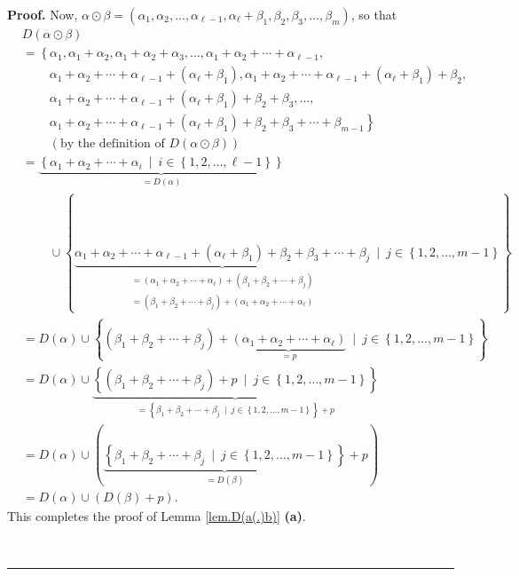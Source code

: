 \documentclass[numbers=enddot,12pt,final,onecolumn,notitlepage,abstracton]{scrartcl}%
\theoremstyle{definition}
\newenvironment{proof}[1][Proof]{\noindent\textbf{#1.} }{\ \rule{0.5em}{0.5em}}
\newenvironment{verlong}{}{}
\begin{document}
\begin{verlong}
\begin{proof}
Now, $\alpha\odot\beta=\left(  \alpha_{1},\alpha_{2},\ldots,\alpha_{\ell
-1},\alpha_{\ell}+\beta_{1},\beta_{2},\beta_{3},\ldots,\beta_{m}\right)  $, so
that%
\begin{align*}
&  D\left(  \alpha\odot\beta\right) \\
&  =\left\{  \alpha_{1},\alpha_{1}+\alpha_{2},\alpha_{1}+\alpha_{2}+\alpha
_{3},\ldots,\alpha_{1}+\alpha_{2}+\cdots+\alpha_{\ell-1},\right. \\
&  \ \ \ \ \ \ \ \ \ \ \left.  \alpha_{1}+\alpha_{2}+\cdots+\alpha_{\ell
-1}+\left(  \alpha_{\ell}+\beta_{1}\right)  ,\alpha_{1}+\alpha_{2}%
+\cdots+\alpha_{\ell-1}+\left(  \alpha_{\ell}+\beta_{1}\right)  +\beta
_{2},\right. \\
&  \ \ \ \ \ \ \ \ \ \ \left.  \alpha_{1}+\alpha_{2}+\cdots+\alpha_{\ell
-1}+\left(  \alpha_{\ell}+\beta_{1}\right)  +\beta_{2}+\beta_{3}%
,\ldots,\right. \\
&  \ \ \ \ \ \ \ \ \ \ \left.  \alpha_{1}+\alpha_{2}+\cdots+\alpha_{\ell
-1}+\left(  \alpha_{\ell}+\beta_{1}\right)  +\beta_{2}+\beta_{3}+\cdots
+\beta_{m-1}\right\} \\
&  \ \ \ \ \ \ \ \ \ \ \left(  \text{by the definition of }D\left(
\alpha\odot\beta\right)  \right) \\
&  =\underbrace{\left\{  \alpha_{1}+\alpha_{2}+\cdots+\alpha_{i}\ \mid
\ i\in\left\{  1,2,\ldots,\ell-1\right\}  \right\}  }_{=D\left(
\alpha\right)  }\\
&  \ \ \ \ \ \ \ \ \ \ \cup\left\{  \underbrace{\alpha_{1}+\alpha_{2}%
+\cdots+\alpha_{\ell-1}+\left(  \alpha_{\ell}+\beta_{1}\right)  +\beta
_{2}+\beta_{3}+\cdots+\beta_{j}}_{\substack{=\left(  \alpha_{1}+\alpha
_{2}+\cdots+\alpha_{\ell}\right)  +\left(  \beta_{1}+\beta_{2}+\cdots
+\beta_{j}\right)  \\=\left(  \beta_{1}+\beta_{2}+\cdots+\beta_{j}\right)
+\left(  \alpha_{1}+\alpha_{2}+\cdots+\alpha_{\ell}\right)  }}\ \mid
\ j\in\left\{  1,2,\ldots,m-1\right\}  \right\} \\
&  =D\left(  \alpha\right)  \cup\left\{  \left(  \beta_{1}+\beta_{2}%
+\cdots+\beta_{j}\right)  +\underbrace{\left(  \alpha_{1}+\alpha_{2}%
+\cdots+\alpha_{\ell}\right)  }_{=p}\ \mid\ j\in\left\{  1,2,\ldots
,m-1\right\}  \right\} \\
&  =D\left(  \alpha\right)  \cup\underbrace{\left\{  \left(  \beta_{1}%
+\beta_{2}+\cdots+\beta_{j}\right)  +p\ \mid\ j\in\left\{  1,2,\ldots
,m-1\right\}  \right\}  }_{=\left\{  \beta_{1}+\beta_{2}+\cdots+\beta
_{j}\ \mid\ j\in\left\{  1,2,\ldots,m-1\right\}  \right\}  +p}\\
&  =D\left(  \alpha\right)  \cup\left(  \underbrace{\left\{  \beta_{1}%
+\beta_{2}+\cdots+\beta_{j}\ \mid\ j\in\left\{  1,2,\ldots,m-1\right\}
\right\}  }_{=D\left(  \beta\right)  }+p\right) \\
&  =D\left(  \alpha\right)  \cup\left(  D\left(  \beta\right)  +p\right)  .
\end{align*}
This completes the proof of Lemma \ref{lem.D(a(.)b)} \textbf{(a)}.


\end{proof}
\end{verlong}
\end{document}

